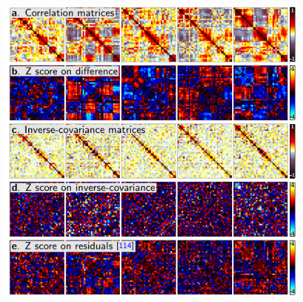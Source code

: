 \documentclass[5p]{elsarticle}
\begin{document}
\begin{figure}
\includegraphics[width=\linewidth]{pg_0005}%



\end{figure}
\end{document}
